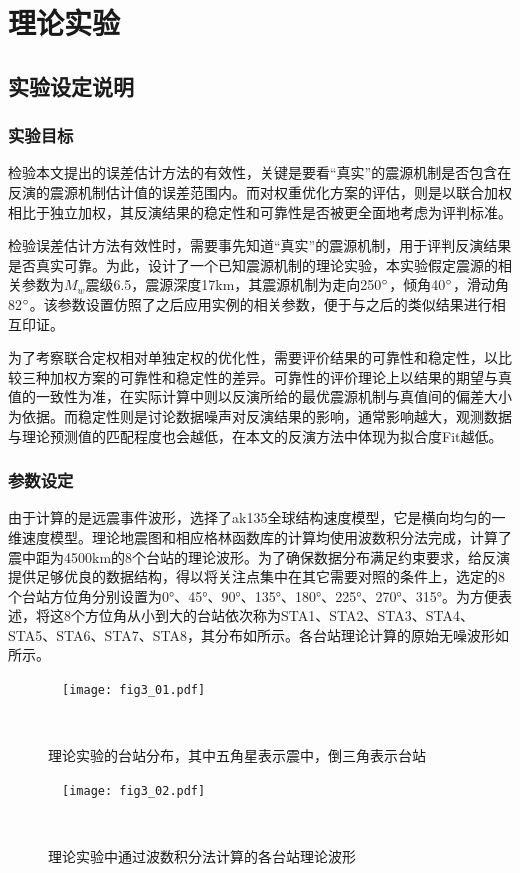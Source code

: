 
\chapter{理论实验}

\section{实验设定说明}
\subsection{实验目标}
检验本文提出的误差估计方法的有效性，关键是要看“真实”的震源机制是否包含在反演的震源机制估计值的误差范围内。而对权重优化方案的评估，则是以联合加权相比于独立加权，其反演结果的稳定性和可靠性是否被更全面地考虑为评判标准。

检验误差估计方法有效性时，需要事先知道“真实”的震源机制，用于评判反演结果是否真实可靠。为此，设计了一个已知震源机制的理论实验，本实验假定震源的相关参数为$M_w$震级6.5，震源深度17km，其震源机制为走向250$^\circ$，倾角40$^\circ$，滑动角82$^\circ$。该参数设置仿照了之后应用实例的相关参数，便于与之后的类似结果进行相互印证。

为了考察联合定权相对单独定权的优化性，需要评价结果的可靠性和稳定性，以比较三种加权方案的可靠性和稳定性的差异。可靠性的评价理论上以结果的期望与真值的一致性为准，在实际计算中则以反演所给的最优震源机制与真值间的偏差大小为依据。而稳定性则是讨论数据噪声对反演结果的影响，通常影响越大，观测数据与理论预测值的匹配程度也会越低，在本文的反演方法中体现为拟合度Fit越低。

\subsection{参数设定}
由于计算的是远震事件波形，选择了ak135全球结构速度模型\citep{Kennett1995}，它是横向均匀的一维速度模型。理论地震图和相应格林函数库的计算均使用波数积分法完成，计算了震中距为4500km的8个台站的理论波形。为了确保数据分布满足约束要求，给反演提供足够优良的数据结构，得以将关注点集中在其它需要对照的条件上，选定的8个台站方位角分别设置为0°、45°、90°、135°、180°、225°、270°、315°。为方便表述，将这8个方位角从小到大的台站依次称为STA1、STA2、STA3、STA4、STA5、STA6、STA7、STA8，其分布如所示。各台站理论计算的原始无噪波形如所示。
\begin{figure}
\centering
  \texttt{[image: fig3\_01.pdf]}
  \caption{理论实验的台站分布，其中五角星表示震中，倒三角表示台站}
  \label{fig3_01}
\end{figure}
\begin{figure}
\centering
  \texttt{[image: fig3\_02.pdf]}
  \caption{理论实验中通过波数积分法计算的各台站理论波形}
  \label{fig3_02}
\end{figure}

